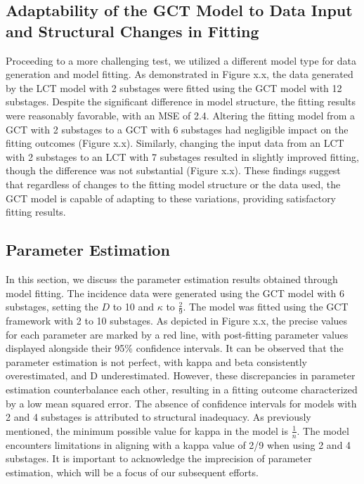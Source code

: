 \documentclass[12pt]{article}
\begin{document}
\subsection{Adaptability of the GCT Model to Data Input and Structural Changes in Fitting}
Proceeding to a more challenging test, we utilized a different model type for data generation and model fitting. As demonstrated in Figure x.x, the data generated by the LCT model with 2 substages were fitted using the GCT model with 12 substages. Despite the significant difference in model structure, the fitting results were reasonably favorable, with an MSE of 2.4. Altering the fitting model from a GCT with 2 substages to a GCT with 6 substages had negligible impact on the fitting outcomes (Figure x.x). Similarly, changing the input data from an LCT with 2 substages to an LCT with 7 substages resulted in slightly improved fitting, though the difference was not substantial (Figure x.x). These findings suggest that regardless of changes to the fitting model structure or the data used, the GCT model is capable of adapting to these variations, providing satisfactory fitting results.

\subsection{Parameter Estimation}
In this section, we discuss the parameter estimation results obtained through model fitting. The incidence data were generated using the GCT model with 6 substages, setting the $D$ to 10 and $\kappa$ to $\frac{2}{9}$. The model was fitted using the GCT framework with 2 to 10 substages. As depicted in Figure x.x, the precise values for each parameter are marked by a red line, with post-fitting parameter values displayed alongside their 95\% confidence intervals. It can be observed that the parameter estimation is not perfect, with kappa and beta consistently overestimated, and D underestimated. However, these discrepancies in parameter estimation counterbalance each other, resulting in a fitting outcome characterized by a low mean squared error. The absence of confidence intervals for models with 2 and 4 substages is attributed to structural inadequacy. As previously mentioned, the minimum possible value for kappa in the model is $\frac{1}{n}$. The model encounters limitations in aligning with a kappa value of 2/9 when using 2 and 4 substages. It is important to acknowledge the imprecision of parameter estimation, which will be a focus of our subsequent efforts.
\end{document}
